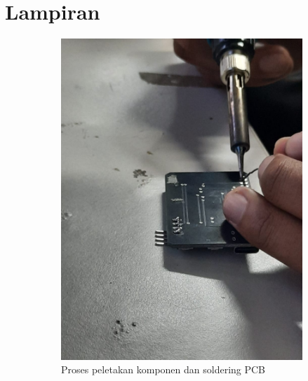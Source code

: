 \section*{Lampiran} %


\begin{figure}[H]
  \centering
  \begin{subfigure}[c]{0.4\linewidth}
    \centering
    \includegraphics[width=\linewidth]{img/modul_4/proses solder pcb.jpg}
    \caption{Proses peletakan komponen dan soldering PCB\label{fig:inisub1}}
  \end{subfigure}
  \hspace{1cm}
  \begin{subfigure}[c]{0.4\linewidth}
    \centering

\end{subfigure}
\end{figure}
